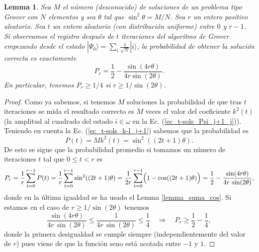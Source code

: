 \documentclass[a4paper,11pt]{article} %
\newtheorem{lemma}{Lemma}
\numberwithin{equation}{section}
\def\Lp{\Bigl(}
\def\Rp{\Bigr)}
\def\rqa{\quad \Rightarrow \quad}
\begin{document}
\begin{lemma} \label{lemma_Pm}
Sea $M$ el número (desconocido) de soluciones de un problema tipo Grover con $N$ elementos y sea $\theta$ tal que $\sin^2 \theta = M/N$. Sea $r$ un entero positivo aleatorio. Sea $t$ un entero aleatorio (con distribución uniforme) entre $0$ y $r-1$. Si observamos el registro después de $t$ iteraciones del algoritmo de Grover empezando desde el estado $|\Psi_0 \rangle = \sum_i \frac{1}{\sqrt{N}} | i \rangle$, la probabilidad de obtener la solución correcta es exactamente 
\begin{equation} \label{lemma_Pm_ec}
P_r = \frac{1}{2} - \frac{\sin (4 r \theta)}{4 r \sin(2 \theta)}.
\end{equation}
En particular, tenemos $P_r \geq 1/4$ si $r \geq 1/\sin ( 2 \theta)$.
\end{lemma}


\begin{proof}
 Como ya sabemos, si tenemos $M$ soluciones la probabilidad de que tras $t$ iteraciones se mida el resultado correcto es $M$ veces el valor del coeficiente $k^2(t)$ (la amplitud al cuadrado del estado $i \in \omega$ en la Ec. (\ref{ec_t-sols_Psi_j+1_j})). Teniendo en cuenta la Ec. (\ref{ec_t-sols_k-l_j+1}) sabemos que la probabilidad es
\begin{equation*}
P(t) = M k^2(t) = \sin^2 ((2t+1)\theta).
\end{equation*}
De esto se sigue que la probabilidad promedio si tomamos un número de iteraciones $t$ tal que $0 \leq t < r$ es
\begin{equation*}
P_r = \frac{1}{r} \sum^{r-1}_{t=0}  P(t) = \frac{1}{r} \sum^{r-1}_{t=0} \sin^2 ((2t+1) \theta) = 
\frac{1}{2r} \sum^{r-1}_{t=0} \Lp 1-\cos ((2t+1) \theta) \Rp = \frac{1}{2} - \frac{\sin (4 r \theta)}{4 r \, \sin (2 \theta)},
\end{equation*}
donde en la última igualdad se ha usado el Lemma \ref{lemma_suma_cos}. Si estamos en el caso de $r \geq 1/\sin (2\theta)$ tenemos
\begin{equation*}
\frac{\sin (4 r \theta)}{4 r \, \sin (2 \theta)} \leq \frac{1}{4 r \, \sin (2 \theta)} \leq \frac{1}{4} \rqa P_r \geq \frac{1}{2} - \frac{1}{4},
\end{equation*}
donde la primera desigualdad se cumple siempre (independientemente del valor de $r$) pues viene de que la función seno está acotada entre $-1$ y $1$.
\end{proof}
\end{document}
